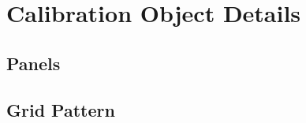 \section{Calibration Object Details}
\subsection{Panels}
\subsection{Grid Pattern}

\begin{center}
    
\end{center}

